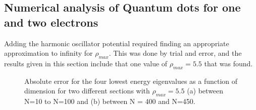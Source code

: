 \documentclass[twoside,onecolumn]{article}
\begin{document}
\subsection{Numerical analysis of Quantum dots for one and two electrons}
Adding the harmonic oscillator potential required finding an appropriate approximation to infinity for $\rho_{max}$. This was done by trial and error, and the results given in this section include that one value of $\rho_{max} = 5.5$ that was found. \\

\begin{figure}[H]
\hspace{-1.0in}
       \caption{Absolute error for the four lowest energy eigenvalues as a function of dimension for two different sections with $\rho_{max}=5.5$ (a)  between N=10 to N=100 and (b) between N = 400 and N=450.}
     \label{fig:Eigenvalues}
\end{figure}
\end{document}
